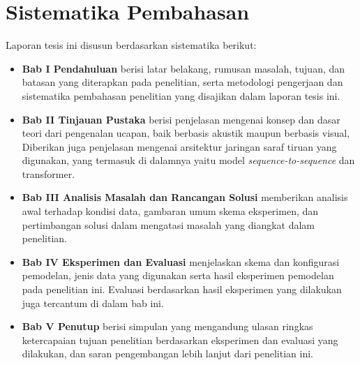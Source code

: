 \section{Sistematika Pembahasan}

Laporan tesis ini disusun berdasarkan sistematika berikut:
\begin{itemize}[label={}]
    \item \textbf{Bab I Pendahuluan} berisi latar belakang, rumusan masalah, tujuan, dan batasan yang diterapkan pada penelitian, serta metodologi pengerjaan dan sistematika pembahasan penelitian yang disajikan dalam laporan tesis ini.
    \item \textbf{Bab II Tinjauan Pustaka} berisi penjelasan mengenai konsep dan dasar teori dari pengenalan ucapan, baik berbasis akustik maupun berbasis visual, Diberikan juga penjelasan mengenai arsitektur jaringan saraf tiruan yang digunakan, yang termasuk di dalamnya yaitu model \textit{sequence-to-sequence} dan transformer.
    \item \textbf{Bab III Analisis Masalah dan Rancangan Solusi} memberikan analisis awal terhadap kondisi data, gambaran umum skema eksperimen, dan pertimbangan solusi dalam mengatasi masalah yang diangkat dalam penelitian.
    \item \textbf{Bab IV Eksperimen dan Evaluasi} menjelaskan skema dan konfigurasi pemodelan, jenis data yang digunakan serta hasil eksperimen pemodelan pada penelitian ini. Evaluasi berdasarkan hasil eksperimen yang dilakukan juga tercantum di dalam bab ini.
    \item \textbf{Bab V Penutup} berisi simpulan yang mengandung ulasan ringkas ketercapaian tujuan penelitian berdasarkan eksperimen dan evaluasi yang dilakukan, dan saran pengembangan lebih lanjut dari penelitian ini.
\end{itemize}

